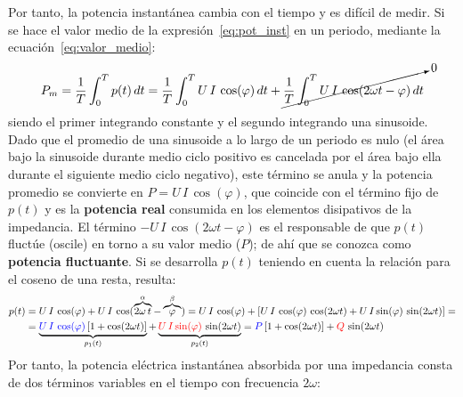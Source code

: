 	Por tanto, la potencia instantánea cambia con el tiempo y es
        difícil de medir. Si se hace el valor medio de la
        expresión~\eqref{eq:pot_inst} en un periodo, mediante la
        ecuación~\eqref{eq:valor_medio}:
	\begin{equation*}
          P_m=\dfrac{1}{T}\int_{0}^{T}p(t)\,dt=\dfrac{1}{T}\int_{0}^{T}U\,I\,\cos(\varphi)\,dt+\cancelto{0}{\dfrac{1}{T}\int_{0}^{T}U\,I\,\cos(2\omega t-\varphi)\,dt}
	\end{equation*}
	siendo el primer integrando constante y el segundo integrando
        una sinusoide. Dado que el promedio de una sinusoide a lo
        largo de un periodo es nulo (el área bajo la sinusoide durante
        medio ciclo positivo es cancelada por el área bajo ella
        durante el siguiente medio ciclo negativo), este término se
        anula y la potencia promedio se convierte en
        $P=U\,I\,\cos(\varphi)$, que coincide con el término fijo de
        $p(t)$ y es la \textbf{potencia real} consumida en los
        elementos disipativos de la impedancia. El término
        $-U\,I\,\cos(2\omega t-\varphi)$ es el responsable de que
        $p(t)$ fluctúe (oscile) en torno a su valor medio ($P$); de
        ahí que se conozca como \textbf{potencia fluctuante}. Si se
        desarrolla $p(t)$ teniendo en cuenta la relación para el
        coseno de una resta, resulta:
	\begin{align*}
          p(t)&=U\,I\,\cos(\varphi)+U\,I\,\cos(\overbrace{2\omega\,t}^{\alpha}-\overbrace{\varphi}^{\beta})=U\,I\,\cos(\varphi)+\left[ U\,I\,\cos(\varphi)\,\cos(2\omega t) + U\,I\sin(\varphi)\,\sin(2\omega t)\right]=\\
              &=\underbrace{{\color{blue}U\,I\,\cos(\varphi)}\left[1+\cos(2\omega t)\right]}_{p_1(t)} + \underbrace{{\color{red}U\,I\sin(\varphi)}\,\sin(2\omega t)}_{p_2(t)}={\color{blue}P}\left[1+\cos(2\omega t)\right] + {\color{red}Q}\,\sin(2\omega t)
	\end{align*}
	Por tanto, la potencia eléctrica instantánea absorbida por una
        impedancia consta de dos términos variables en el tiempo con
        frecuencia $2\omega$:
